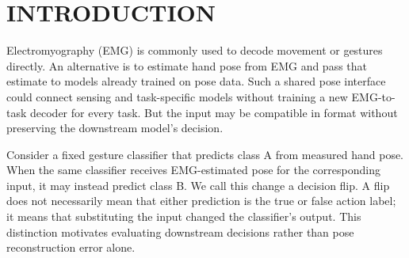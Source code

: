 \begin{abstract}
Hand pose may provide a shared interface between electromyography (EMG) sensing and models trained on pose data. Yet an input that fits a model does not necessarily preserve its decisions. We investigate this gap using one frozen EMG-to-pose estimator and six frozen pose classifiers built from four public datasets. By comparing decisions on paired measured and estimated poses, we first quantify how often input substitution changes the outputs of unchanged classifiers. We then test whether learned offline ranking can preferentially retain decisions that match the measured-pose reference. Across 80 participants, full-feature ranking reduced median paired overall disagreement by 1.87--4.65 percentage points relative to boundary-based selection at 30\% retention. However, this overall improvement did not always extend to individual reference classes. For SHOW instruction, overall disagreement improved by 2.61 points while class-balanced disagreement worsened by 20.88 points among the same 79 evaluable participants. Selection also reduced evaluable class support in some consumers. These findings show that lower overall disagreement does not guarantee class-balanced decision preservation, motivating joint evaluation of overall disagreement, class-balanced disagreement, and reference-class support. The results characterize retrospective agreement with model-generated reference decisions, not independent action accuracy or validated online rejection.
\end{abstract}

\section{INTRODUCTION}\label{introduction}
Electromyography (EMG) is commonly used to decode movement or gestures directly. An alternative is to estimate hand pose from EMG and pass that estimate to models already trained on pose data. Such a shared pose interface could connect sensing and task-specific models without training a new EMG-to-task decoder for every task. But the input may be compatible in format without preserving the downstream model's decision.

Consider a fixed gesture classifier that predicts class A from measured hand pose. When the same classifier receives EMG-estimated pose for the corresponding input, it may instead predict class B. We call this change a decision flip. A flip does not necessarily mean that either prediction is the true or false action label; it means that substituting the input changed the classifier's output. This distinction motivates evaluating downstream decisions rather than pose reconstruction error alone.

